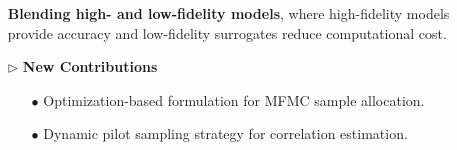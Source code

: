 \documentclass{beamer}
\begin{document}
\begin{frame}[t]
\begin{itemize}[leftmargin=5pt]
{\begin{itemize}[leftmargin=15pt]
                \textcolor{mybrown1}{{\bf Blending high- and low-fidelity models}, where high-fidelity models provide accuracy and low-fidelity surrogates reduce computational cost.}

                
                

                

                
        
            \end{itemize}
            }
            \vspace{2mm}
            \item[$\triangleright$] \textcolor{myblue3}{\bf New Contributions}
                {\fontsize{9}{9}\selectfont
                \begin{itemize}[leftmargin=15pt] 
                \item[\textcolor{myblue3}{$\bullet$}] Optimization-based formulation for MFMC sample allocation.
                \item[\textcolor{myblue3}{$\bullet$}] Dynamic pilot sampling strategy for correlation estimation.
                \end{itemize}
                }
    \end{itemize}
\end{frame}
\end{document}
